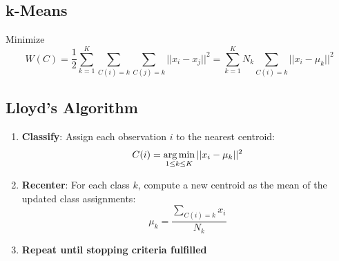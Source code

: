 \subsection{k-Means}
Minimize $$W(C) = \frac{1}{2} \sum\limits_{k=1}^K \sum\limits_{C(i)=k} \sum\limits_{C(j)=k} ||x_i - x_j||^2 = \sum\limits_{k=1}^K N_k \sum\limits_{C(i)=k} ||x_i - \mu_k||^2$$

\subsection{Lloyd's Algorithm}
\begin{enumerate}
\item \textbf{Classify}: Assign each observation $i$ to the nearest centroid: $$C(i) = \operatorname*{arg\,min}\limits_{1\leq k \leq K} ||x_i - \mu_k||^2$$
\item \textbf{Recenter}: For each class $k$, compute a new centroid as the mean of the updated class assignments: $$\mu_k = \frac{\sum\limits_{C(i)=k} x_i}{N_k}$$
\item \textbf{Repeat until stopping criteria fulfilled}
\end{enumerate}
